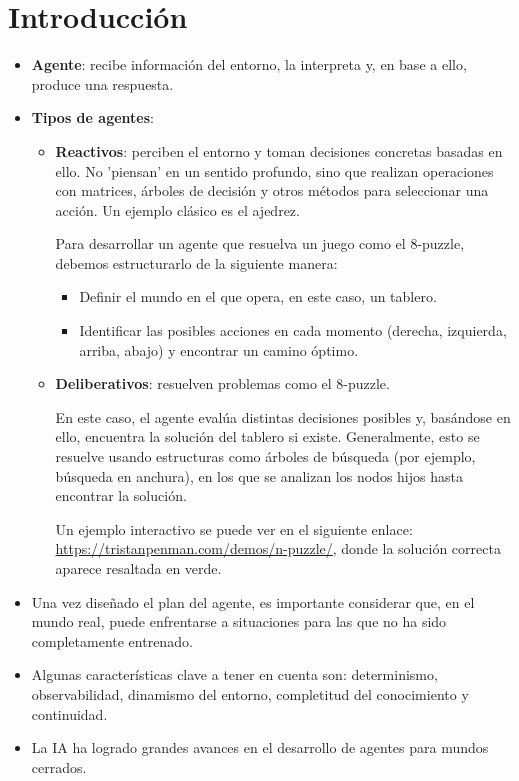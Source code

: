 
\section{Introducción}
\begin{itemize}
    \item \textbf{Agente}: recibe información del entorno, la interpreta y, en base a ello, produce una respuesta.
    \item \textbf{Tipos de agentes}:
    \begin{itemize}
        \item \textbf{Reactivos}: perciben el entorno y toman decisiones concretas basadas en ello. No 'piensan' en un sentido profundo, sino que realizan operaciones con matrices, árboles de decisión y otros métodos para seleccionar una acción. Un ejemplo clásico es el ajedrez.

        Para desarrollar un agente que resuelva un juego como el 8-puzzle, debemos estructurarlo de la siguiente manera:
        \begin{itemize}
            \item Definir el mundo en el que opera, en este caso, un tablero.
            \item Identificar las posibles acciones en cada momento (derecha, izquierda, arriba, abajo) y encontrar un camino óptimo.
        \end{itemize}

        \item \textbf{Deliberativos}: resuelven problemas como el 8-puzzle.  
        
        En este caso, el agente evalúa distintas decisiones posibles y, basándose en ello, encuentra la solución del tablero si existe.  
        Generalmente, esto se resuelve usando estructuras como árboles de búsqueda (por ejemplo, búsqueda en anchura), en los que se analizan los nodos hijos hasta encontrar la solución.  

        Un ejemplo interactivo se puede ver en el siguiente enlace:  
        \url{https://tristanpenman.com/demos/n-puzzle/}, donde la solución correcta aparece resaltada en verde.
    \end{itemize}
    
    \item Una vez diseñado el plan del agente, es importante considerar que, en el mundo real, puede enfrentarse a situaciones para las que no ha sido completamente entrenado.
    \item Algunas características clave a tener en cuenta son: determinismo, observabilidad, dinamismo del entorno, completitud del conocimiento y continuidad.
    \item La IA ha logrado grandes avances en el desarrollo de agentes para mundos cerrados.
\end{itemize}


